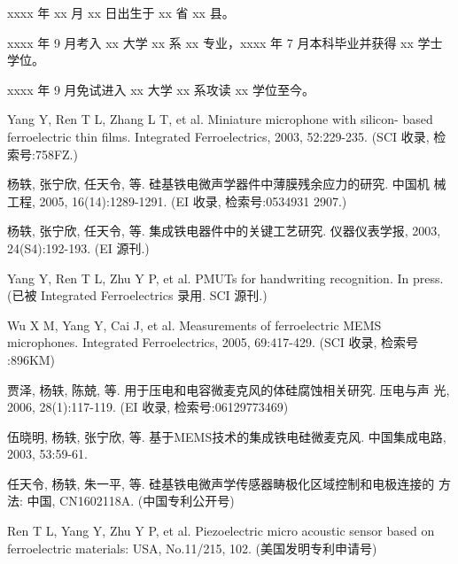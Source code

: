 \begin{resume}

  xxxx 年 xx 月 xx 日出生于 xx 省 xx 县。

  xxxx 年 9 月考入 xx 大学 xx 系 xx 专业，xxxx 年 7 月本科毕业并获得 xx 学士学位。

  xxxx 年 9 月免试进入 xx 大学 xx 系攻读 xx 学位至今。


  \begin{publications}
    \item Yang Y, Ren T L, Zhang L T, et al. Miniature microphone with silicon-
      based ferroelectric thin films. Integrated Ferroelectrics, 2003,
      52:229-235. (SCI 收录, 检索号:758FZ.)
    \item 杨轶, 张宁欣, 任天令, 等. 硅基铁电微声学器件中薄膜残余应力的研究. 中国机
      械工程, 2005, 16(14):1289-1291. (EI 收录, 检索号:0534931 2907.)
    \item 杨轶, 张宁欣, 任天令, 等. 集成铁电器件中的关键工艺研究. 仪器仪表学报,
      2003, 24(S4):192-193. (EI 源刊.)
  \end{publications}

  \begin{publications}[before=\publicationskip,after=\publicationskip]
    \item Yang Y, Ren T L, Zhu Y P, et al. PMUTs for handwriting recognition. In
      press. (已被 Integrated Ferroelectrics 录用. SCI 源刊.)
  \end{publications}

  \begin{publications}
    \item Wu X M, Yang Y, Cai J, et al. Measurements of ferroelectric MEMS
      microphones. Integrated Ferroelectrics, 2005, 69:417-429. (SCI 收录, 检索号
      :896KM)
    \item 贾泽, 杨轶, 陈兢, 等. 用于压电和电容微麦克风的体硅腐蚀相关研究. 压电与声
      光, 2006, 28(1):117-119. (EI 收录, 检索号:06129773469)
    \item 伍晓明, 杨轶, 张宁欣, 等. 基于MEMS技术的集成铁电硅微麦克风. 中国集成电路,
      2003, 53:59-61.
  \end{publications}

  \begin{achievements}
    \item 任天令, 杨轶, 朱一平, 等. 硅基铁电微声学传感器畴极化区域控制和电极连接的
      方法: 中国, CN1602118A. (中国专利公开号)
    \item Ren T L, Yang Y, Zhu Y P, et al. Piezoelectric micro acoustic sensor
      based on ferroelectric materials: USA, No.11/215, 102. (美国发明专利申请号)
  \end{achievements}

\end{resume}
